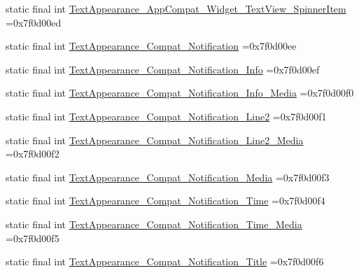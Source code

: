 \begin{DoxyCompactItemize}
\item 
static final int \mbox{\hyperlink{classcom_1_1example_1_1trainawearapplication_1_1_r_1_1style_a5c0d864c51bcc29583ab3e57a666061d}{Text\+Appearance\+\_\+\+App\+Compat\+\_\+\+Widget\+\_\+\+Text\+View\+\_\+\+Spinner\+Item}} =0x7f0d00ed
\item 
static final int \mbox{\hyperlink{classcom_1_1example_1_1trainawearapplication_1_1_r_1_1style_a2037db3dab362bccc88fd0600ad7ee81}{Text\+Appearance\+\_\+\+Compat\+\_\+\+Notification}} =0x7f0d00ee
\item 
static final int \mbox{\hyperlink{classcom_1_1example_1_1trainawearapplication_1_1_r_1_1style_ac91529d792818a37e3bc669983dc48d8}{Text\+Appearance\+\_\+\+Compat\+\_\+\+Notification\+\_\+\+Info}} =0x7f0d00ef
\item 
static final int \mbox{\hyperlink{classcom_1_1example_1_1trainawearapplication_1_1_r_1_1style_ac2e138f5eb061827b91ea5c534f43ea3}{Text\+Appearance\+\_\+\+Compat\+\_\+\+Notification\+\_\+\+Info\+\_\+\+Media}} =0x7f0d00f0
\item 
static final int \mbox{\hyperlink{classcom_1_1example_1_1trainawearapplication_1_1_r_1_1style_abf950d33d370eb36000aa81563eb1621}{Text\+Appearance\+\_\+\+Compat\+\_\+\+Notification\+\_\+\+Line2}} =0x7f0d00f1
\item 
static final int \mbox{\hyperlink{classcom_1_1example_1_1trainawearapplication_1_1_r_1_1style_a7b35336ef038f19fc548738fd9ecd996}{Text\+Appearance\+\_\+\+Compat\+\_\+\+Notification\+\_\+\+Line2\+\_\+\+Media}} =0x7f0d00f2
\item 
static final int \mbox{\hyperlink{classcom_1_1example_1_1trainawearapplication_1_1_r_1_1style_af4c0dc49cfa0b4d861178e64f1d8ca53}{Text\+Appearance\+\_\+\+Compat\+\_\+\+Notification\+\_\+\+Media}} =0x7f0d00f3
\item 
static final int \mbox{\hyperlink{classcom_1_1example_1_1trainawearapplication_1_1_r_1_1style_a91fcd9e3b079b3f36de0c8a22d7b9c45}{Text\+Appearance\+\_\+\+Compat\+\_\+\+Notification\+\_\+\+Time}} =0x7f0d00f4
\item 
static final int \mbox{\hyperlink{classcom_1_1example_1_1trainawearapplication_1_1_r_1_1style_a9c520cfbae8fb815d66988b524ea180e}{Text\+Appearance\+\_\+\+Compat\+\_\+\+Notification\+\_\+\+Time\+\_\+\+Media}} =0x7f0d00f5
\item 
static final int \mbox{\hyperlink{classcom_1_1example_1_1trainawearapplication_1_1_r_1_1style_a647b5cf9d98d1b466f762191768b9105}{Text\+Appearance\+\_\+\+Compat\+\_\+\+Notification\+\_\+\+Title}} =0x7f0d00f6
\item 

\end{DoxyCompactItemize}
